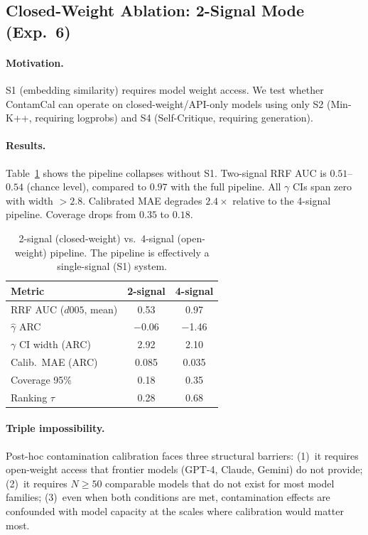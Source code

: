 \documentclass[11pt,a4paper]{article}
\newcommand{\gam}{\gamma}
\begin{document}
\subsection{Closed-Weight Ablation: 2-Signal Mode (Exp.~6)}
\label{sec:exp_closed}

\paragraph{Motivation.}
S1 (embedding similarity) requires model weight access.
We test whether ContamCal can operate on closed-weight/API-only models using only S2 (Min-K++, requiring logprobs) and S4 (Self-Critique, requiring generation).

\paragraph{Results.}
Table~\ref{tab:2signal} shows the pipeline collapses without S1.
Two-signal RRF AUC is $0.51$--$0.54$ (chance level), compared to $0.97$ with the full pipeline.
All $\gam$ CIs span zero with width $> 2.8$.
Calibrated MAE degrades $2.4\times$ relative to the 4-signal pipeline.
Coverage drops from $0.35$ to $0.18$.

\begin{table}[t]
\centering
\small
\caption{2-signal (closed-weight) vs.\ 4-signal (open-weight) pipeline. The pipeline is effectively a single-signal (S1) system.}
\label{tab:2signal}
\begin{tabular}{lcc}
\toprule
\textbf{Metric} & 2-signal & 4-signal \\
\midrule
RRF AUC ($d005$, mean) & 0.53 & 0.97 \\
$\hat{\gam}$ ARC         & $-$0.06 & $-$1.46 \\
$\gam$ CI width (ARC)    & 2.92 & 2.10 \\
Calib.\ MAE (ARC)        & 0.085 & 0.035 \\
Coverage 95\%             & 0.18 & 0.35 \\
Ranking $\tau$            & 0.28 & 0.68 \\
\bottomrule
\end{tabular}
\end{table}

\paragraph{Triple impossibility.}
Post-hoc contamination calibration faces three structural barriers:
(1)~it requires open-weight access that frontier models (GPT-4, Claude, Gemini) do not provide;
(2)~it requires $N \geq 50$ comparable models that do not exist for most model families;
(3)~even when both conditions are met, contamination effects are confounded with model capacity at the scales where calibration would matter most.
\end{document}
